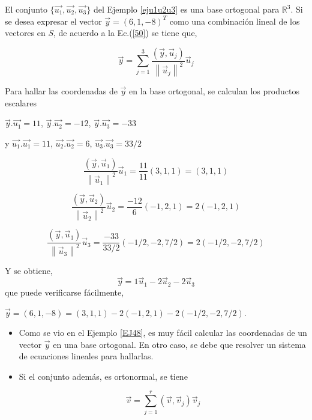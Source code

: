 \begin{example}
\label{EJ48}
El conjunto $\{\vec{u_1}, \vec{u_2}, \vec{u_3}\}$  del Ejemplo \ref{eju1u2u3}   es una base ortogonal para
$\mathbb{R}^3$. Si se  desea expresar el vector $\vec{y}=(6,1,-8)^T$ como una combinación lineal de los vectores en $S$,
de acuerdo a la  Ec.(\ref{50}) se tiene que, 

\begin{equation*}
  \vec{y} =\sum^{3}_{j=1}   \frac {(\vec{y}, \vec{u}_j)} {\left\|\vec{u}_j\right\|^{2}} \vec{u}_j
  \label{60}
\end{equation*}

\bigskip

Para hallar las coordenadas de $\vec{y}$ en la base ortogonal,   se  calculan los productos escalares

\bigskip

$\vec{y}. \vec{u_1}= 11$, $\vec{y}. \vec{u_2}= -12$, $\vec{y}. \vec{u_3}= -33$

\bigskip
y 
$\vec{u_1}. \vec{u_1}= 11$, $\vec{u_2}. \vec{u_2}= 6$, $\vec{u_3}. \vec{u_3}= 33/2$



 \bigskip

\begin{equation*}
  \frac {(\vec{y}, \vec{u}_1)} {\left\|\vec{u}_1\right\|^{2}} \vec{u}_1=\frac{11}{11}(3,1,1) =(3,1,1)
  \label{70}
\end{equation*}

\begin{equation*}
  \frac {(\vec{y}, \vec{u}_2)} {\left\|\vec{u}_2\right\|^{2}} \vec{u}_2=\frac{-12}{6}(-1,2,1)=2(-1,2,1)
  \label{70}
\end{equation*}

\begin{equation*}
   \frac {(\vec{y}, \vec{u}_3)} {\left\|\vec{u}_3\right\|^{2}} \vec{u}_3=\frac{-33}{33/2}(-1/2,-2,7/2)=2(-1/2,-2,7/2)
  \label{80}
\end{equation*}

Y se obtiene, 
\[
\vec{y}= 1 \vec{u}_1 -2 \vec{u}_2 -2 \vec{u}_3 
\]
\noindent
que puede verificarse fácilmente,

$\vec{y}=(6,1,-8)=(3,1,1) -2(-1,2,1) -2 (-1/2,-2,7/2)$.
\end{example}

\bigskip

\begin{remark}
 \begin{itemize}
     \item

     Como se vio en el Ejemplo  \ref{EJ48}, es muy  fácil  calcular las coordenadas de un vector $\vec{y}$ en una base ortogonal. En otro caso,  se debe que resolver un sistema de ecuaciones lineales para hallarlas.
\item
Si el conjunto además, es ortonormal, se tiene

$$ \vec{v} =\sum^{r}_{j=1}   (\vec{v}, \vec{v}_j)  \vec{v}_j $$
 \end{itemize}
\end{remark}

